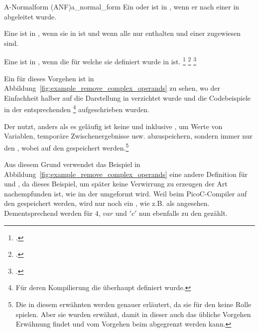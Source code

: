 \begin{Definition}{A-Normalform (ANF)}{a_normal_form}
  Ein  oder  ist in , wenn er nach einer  in  abgeleitet wurde.

  Eine  ist in , wenn sie in  ist und wenn alle  nur  enthalten und einer  zugewiesen sind.

  Eine  ist in , wenn die  für welche sie definiert wurde in  ist.
  \footcite{noauthor_-normalization_nodate}
  \footcite{bolingbroke_types_2009}
  \footcite{g_siek_course_2022}
\end{Definition}

Ein  für dieses Vorgehen ist in Abbildung~\ref{fig:example_remove_complex_operands} zu sehen, wo der Einfachheit halber auf die Darstellung in  verzichtet wurde und die Codebeispiele in der entsprechenden \footnote{Für deren Kompilierung die  überhaupt definiert wurde.} aufgeschrieben wurden.

Der  nutzt, anders als es geläufig ist keine  und  inklusive , um Werte von Variablen, temporäre Zwischenergebnisse usw. abzuspeichern, sondern immer nur den , wobei  auf den  gespeichert werden.\footnote{Die in diesem  erwähnten  werden  genauer erläutert, da sie für den  keine Rolle spielen. Aber sie wurden erwähnt, damit in dieser  auch das übliche Vorgehen Erwähnung findet und vom Vorgehen beim  abgegrenzt werden kann.}

Aus diesem Grund verwendet das Beispiel in Abbildung~\ref{fig:example_remove_complex_operands} eine andere Definition für  und , da dieses Beispiel, um später keine Verwirrung zu erzeugen der Art nachempfunden ist, wie im  der  umgeformt wird. Weil beim PicoC-Compiler  auf den  gespeichert werden, wird nur noch ein , wie z.B.  als  angesehen. Dementsprechend werden  für  $4$,  $var$ und  $'c'$ nun ebenfalls zu den  gezählt.

